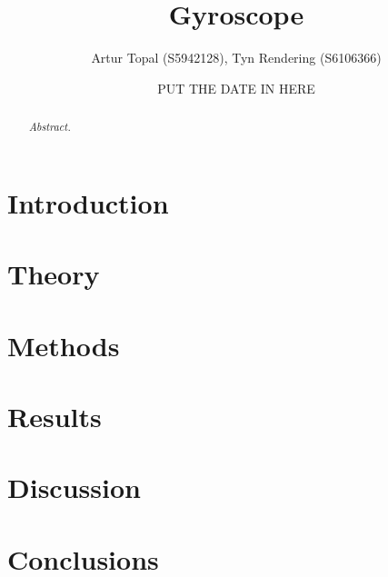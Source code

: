 \documentclass[a4paper,12pt]{article}
\title{Gyroscope}
\author{Artur Topal (S5942128), Tyn Rendering (S6106366)}
\date{PUT THE DATE IN HERE}
\begin{document}
\begin{titlingpage}
  \centering
  \maketitle
  \vspace{2cm}
  \begin{abstract}
  \textit{Abstract.}
\end{abstract}

\end{titlingpage}

\break
\tableofcontents
\break
\section{Introduction} \label{sec:introduction}


\section{Theory} \label{sec:theory}


\section{Methods} \label{sec:methods}


\section{Results} \label{sec:results}


\section{Discussion} \label{sec:discussion}


\section{Conclusions} \label{sec:conclusions}


\end{document}
